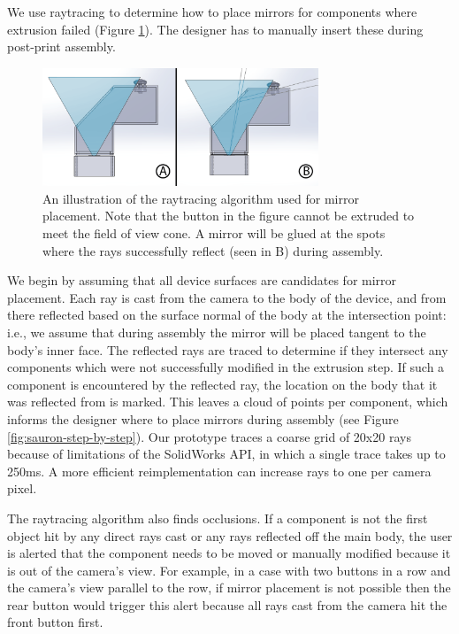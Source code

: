 We use raytracing to determine how to place mirrors for components where extrusion failed (Figure \ref{fig:sauron-raytracing}). The designer has to manually insert these during post-print assembly. %

\begin{figure}
\centering
\includegraphics[width=3.25in]{figures/sauron/reflection.png}
\caption{An illustration of the raytracing algorithm used for mirror placement. Note that the button in the figure cannot be extruded to meet the field of view cone. A mirror will be glued at the spots where the rays successfully reflect (seen in B) during assembly.}
\label{fig:sauron-raytracing}
\end{figure}

We begin by assuming that all device surfaces are candidates for mirror placement. Each ray is cast from the camera to the body of the device, and from there reflected  based on the surface normal of the body at the intersection point: i.e., we assume that during assembly the mirror will be placed tangent to the body's inner face. The reflected rays are traced to determine if they intersect any components which were not successfully modified in the extrusion step. If such a component is encountered by the reflected ray, the location on the body that it was reflected from is marked. This leaves a cloud of points per component, which informs the designer where to place mirrors during assembly (see Figure \ref{fig:sauron-step-by-step}). Our prototype traces a coarse grid of 
20x20 rays because of limitations of the SolidWorks API, in which a single trace takes up to 250ms. A more efficient reimplementation can increase rays to one per camera pixel.

The raytracing algorithm also finds occlusions. If a component %
is not the first object hit by any direct rays cast or any rays reflected off the main body, the user is alerted that the component needs to be moved or manually modified because it is out of the camera's view. For example, in a case with two buttons in a row and the camera's view parallel to the row, if mirror placement is not possible then the rear button would trigger this alert because all rays cast from the camera hit the front button first.

